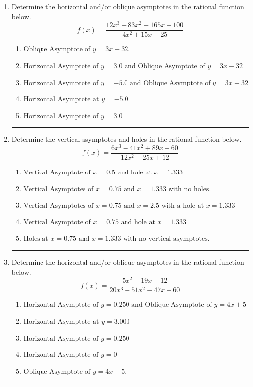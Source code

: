 \documentclass[14pt]{extbook}
\newcommand{\litem}[1]{\item#1\hspace*{-1cm}\rule{\textwidth}{0.4pt}}
\begin{document}
\begin{enumerate}
{\begin{enumerate}[label=\Alph*.]
\end{enumerate} }
\litem{
Determine the horizontal and/or oblique asymptotes in the rational function below.\[ f(x) = \frac{12x^{3} -83 x^{2} +165 x -100}{4x^{2} +15 x -25} \]\begin{enumerate}[label=\Alph*.]
\item \( \text{Oblique Asymptote of } y = 3x -32. \)
\item \( \text{Horizontal Asymptote of } y = 3.0 \text{ and Oblique Asymptote of } y = 3x -32 \)
\item \( \text{Horizontal Asymptote of } y = -5.0 \text{ and Oblique Asymptote of } y = 3x -32 \)
\item \( \text{Horizontal Asymptote at } y = -5.0 \)
\item \( \text{Horizontal Asymptote of } y = 3.0  \)

\end{enumerate} }
\litem{
Determine the vertical asymptotes and holes in the rational function below.\[ f(x) = \frac{6x^{3} -41 x^{2} +89 x -60}{12x^{2} -25 x + 12} \]\begin{enumerate}[label=\Alph*.]
\item \( \text{Vertical Asymptote of } x = 0.5 \text{ and hole at } x = 1.333 \)
\item \( \text{Vertical Asymptotes of } x = 0.75 \text{ and } x = 1.333 \text{ with no holes.} \)
\item \( \text{Vertical Asymptotes of } x = 0.75 \text{ and } x = 2.5 \text{ with a hole at } x = 1.333 \)
\item \( \text{Vertical Asymptote of } x = 0.75 \text{ and hole at } x = 1.333 \)
\item \( \text{Holes at } x = 0.75 \text{ and } x = 1.333 \text{ with no vertical asymptotes.} \)

\end{enumerate} }
\litem{
Determine the horizontal and/or oblique asymptotes in the rational function below.\[ f(x) = \frac{5x^{2} -19 x + 12}{20x^{3} -51 x^{2} -47 x + 60} \]\begin{enumerate}[label=\Alph*.]
\item \( \text{Horizontal Asymptote of } y = 0.250 \text{ and Oblique Asymptote of } y = 4x + 5 \)
\item \( \text{Horizontal Asymptote at } y = 3.000 \)
\item \( \text{Horizontal Asymptote of } y = 0.250  \)
\item \( \text{Horizontal Asymptote of } y = 0 \)
\item \( \text{Oblique Asymptote of } y = 4x + 5. \)


\end{enumerate}}
\end{enumerate}
\end{document}
